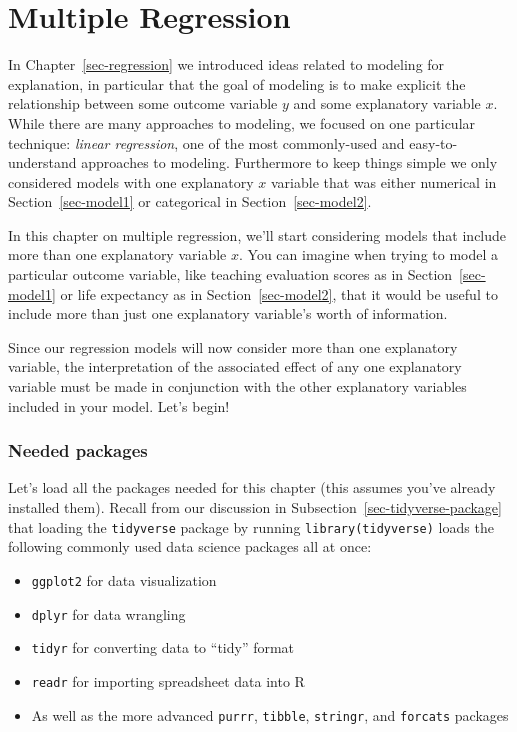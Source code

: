 \documentclass[
  letterpaper,
  DIV=11,
  numbers=noendperiod]{scrreprt}
\providecommand{\tightlist}{%
  \setlength{\itemsep}{0pt}\setlength{\parskip}{0pt}}\usepackage{longtable,booktabs,array}
\theoremstyle{definition}
\theoremstyle{remark}
\begin{document}
\hypertarget{sec-multiple-regression}{%
\chapter{Multiple Regression}\label{sec-multiple-regression}}

In Chapter~\ref{sec-regression} we introduced ideas related to modeling
for explanation, in particular that the goal of modeling is to make
explicit the relationship between some outcome variable \(y\) and some
explanatory variable \(x\). While there are many approaches to modeling,
we focused on one particular technique: \emph{linear regression}, one of
the most commonly-used and easy-to-understand approaches to modeling.
Furthermore to keep things simple we only considered models with one
explanatory \(x\) variable that was either numerical in
Section~\ref{sec-model1} or categorical in Section~\ref{sec-model2}.

In this chapter on multiple regression, we'll start considering models
that include more than one explanatory variable \(x\). You can imagine
when trying to model a particular outcome variable, like teaching
evaluation scores as in Section~\ref{sec-model1} or life expectancy as
in Section~\ref{sec-model2}, that it would be useful to include more
than just one explanatory variable's worth of information.

Since our regression models will now consider more than one explanatory
variable, the interpretation of the associated effect of any one
explanatory variable must be made in conjunction with the other
explanatory variables included in your model. Let's begin!

\hypertarget{needed-packages}{%
\subsection*{Needed packages}\label{needed-packages}}

Let's load all the packages needed for this chapter (this assumes you've
already installed them). Recall from our discussion in
Subsection~\ref{sec-tidyverse-package} that loading the
\texttt{tidyverse} package by running \texttt{library(tidyverse)} loads
the following commonly used data science packages all at once:

\begin{itemize}
\tightlist
\item
  \texttt{ggplot2} for data visualization
\item
  \texttt{dplyr} for data wrangling
\item
  \texttt{tidyr} for converting data to ``tidy'' format
\item
  \texttt{readr} for importing spreadsheet data into R
\item
  As well as the more advanced \texttt{purrr}, \texttt{tibble},
  \texttt{stringr}, and \texttt{forcats} packages
\end{itemize}
\end{document}
